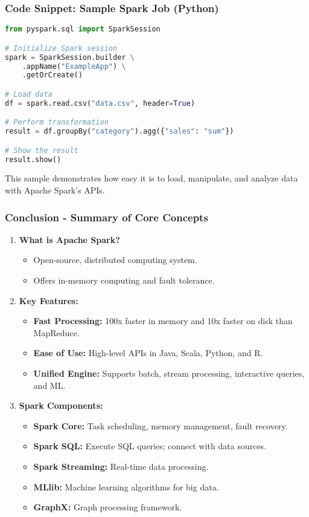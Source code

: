 \documentclass[aspectratio=169]{beamer}
\begin{document}
\begin{frame}[fragile]
    \frametitle{Code Snippet: Sample Spark Job (Python)}
    \begin{lstlisting}[language=Python]
from pyspark.sql import SparkSession

# Initialize Spark session
spark = SparkSession.builder \
    .appName("ExampleApp") \
    .getOrCreate()

# Load data
df = spark.read.csv("data.csv", header=True)

# Perform transformation
result = df.groupBy("category").agg({"sales": "sum"})

# Show the result
result.show()
    \end{lstlisting}
    This sample demonstrates how easy it is to load, manipulate, and analyze data with Apache Spark's APIs.
\end{frame}

\begin{frame}[fragile]
    \frametitle{Conclusion - Summary of Core Concepts}
    
    \begin{enumerate}
        \item \textbf{What is Apache Spark?}
        \begin{itemize}
            \item Open-source, distributed computing system.
            \item Offers in-memory computing and fault tolerance.
        \end{itemize}

        \item \textbf{Key Features:}
        \begin{itemize}
            \item \textbf{Fast Processing:} 100x faster in memory and 10x faster on disk than MapReduce.
            \item \textbf{Ease of Use:} High-level APIs in Java, Scala, Python, and R.
            \item \textbf{Unified Engine:} Supports batch, stream processing, interactive queries, and ML.
        \end{itemize}
        
        \item \textbf{Spark Components:}
        \begin{itemize}
            \item \textbf{Spark Core:} Task scheduling, memory management, fault recovery.
            \item \textbf{Spark SQL:} Execute SQL queries; connect with data sources.
            \item \textbf{Spark Streaming:} Real-time data processing.
            \item \textbf{MLlib:} Machine learning algorithms for big data.
            \item \textbf{GraphX:} Graph processing framework.
        \end{itemize}
    \end{enumerate}
\end{frame}
\end{document}
